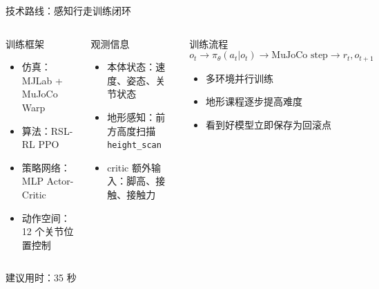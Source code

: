 \documentclass[aspectratio=169,11pt]{ctexbeamer}
\begin{document}
\begin{frame}{技术路线：感知行走训练闭环}
  \begin{columns}[T,onlytextwidth]
    \begin{block}{训练框架}
      \begin{itemize}
        \item 仿真：MJLab + MuJoCo Warp
        \item 算法：RSL-RL PPO
        \item 策略网络：MLP Actor-Critic
        \item 动作空间：12 个关节位置控制
      \end{itemize}
    \end{block}

    \begin{block}{观测信息}
      \begin{itemize}
        \item 本体状态：速度、姿态、关节状态
        \item 地形感知：前方高度扫描 \texttt{height\_scan}
        \item critic 额外输入：脚高、接触、接触力
      \end{itemize}
    \end{block}

    \begin{block}{训练流程}
      \[
      o_t \rightarrow \pi_\theta(a_t|o_t)
      \rightarrow \text{MuJoCo step}
      \rightarrow r_t, o_{t+1}
      \]
      \vspace{-0.3em}
      \begin{itemize}
        \item 多环境并行训练
        \item 地形课程逐步提高难度
        \item 看到好模型立即保存为回滚点
      \end{itemize}
    \end{block}
  \end{columns}
  \vfill
  {\footnotesize 建议用时：35 秒}
\end{frame}
\end{document}
